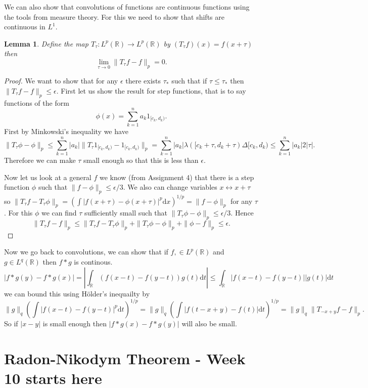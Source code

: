 \documentclass[11pt]{article}
\newtheorem{lem}[thm]{Lemma}
\theoremstyle{definition}
\theoremstyle{remark}
\begin{document}
We can also show that convolutions of functions are continuous functions using the tools from measure theory. For this we need to show that shifts are continuous in $L^1$.
\begin{lem}
Define the map $T_\tau: L^p(\mathbb{R}) \rightarrow L^p(\mathbb{R})$ by $(T_\tau f)(x) = f(x+ \tau)$ then 
\[ \lim_{\tau \rightarrow 0}\|T_\tau f - f\|_p = 0. \]
\end{lem}
\begin{proof}
We want to show that for any $\epsilon$ there exists $\tau_*$ such that if $\tau \leq \tau_*$ then $\|T_\tau f-f\|_p \leq \epsilon$. First let us show the result for step functions, that is to say functions of the form
\[ \phi(x) = \sum_{k=1}^n a_k 1_{[c_k, d_k)}.\] First by Minkowski's inequality we have
\[ \| T_\tau \phi - \phi\|_p \leq \sum_{k=1}^n |a_k| \| T_\tau 1_{[c_k, d_k)} - 1_{[c_k, d_k)}\|_p  = \sum_{k=1}^n |a_k| \lambda ([c_k + \tau, d_k + \tau) \Delta [c_k, d_k) \leq \sum_{k=1}^n |a_k| 2|\tau|.\] Therefore we can make $\tau$ small enough so that this is less than $\epsilon$. 

Now let us look at a general $f$ we know (from Assignment 4) that there is a step function $\phi$ such that $\|f-\phi\|_p \leq \epsilon/3$. We also can change variables $x \leftrightarrow x+\tau$ so $\|T_\tau f - T_\tau \phi\|_p = \left( \int |f(x+\tau) - \phi(x+\tau)|^p \mathrm{d}x\right)^{1/p} = \|f-\phi\|_p$ for any $\tau$. For this $\phi$ we can find $\tau$ sufficiently small such that $\|T_\tau \phi - \phi\|_p \leq \epsilon/3$. Hence
\[ \|T_\tau f - f\|_p  \leq \|T_\tau f - T_\tau \phi\|_p + \| T_\tau \phi - \phi\|_p + \| \phi - f\|_p \leq \epsilon. \]
\end{proof}

Now we go back to convolutions, we can show that if $f,  \in L^p(\mathbb{R})$ and $g \in L^q(\mathbb{R})$ then $f*g$ is continous. 
\[ |f*g(y) - f*g(x)| = |\int_{\mathbb{R}}(f(x-t) - f(y-t)) g(t) \mathrm{d}t| \leq \int_\mathbb{R} |f(x-t)-f(y-t)||g(t)| \mathrm{d}t  \]
we can bound this using H\"older's inequailty by
\[ \|g\|_q \left(\int |f(x-t) - f(y-t)|^p\mathrm{d}t\right)^{1/p} = \|g\|_q \left(\int |f(t-x+y) - f(t)| \mathrm{d}t\right)^{1/p} = \|g\|_q \| T_{-x+y} f - f\|_p. \] So if $|x-y|$ is small enough then $|f*g(x) - f*g(y)|$ will also be small.

\section{Radon-Nikodym Theorem - Week 10 starts here}
\end{document}
